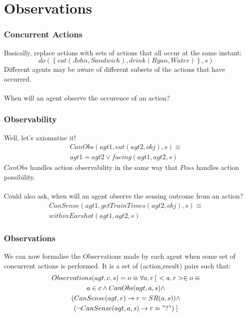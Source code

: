 \documentclass{beamer}
\begin{document}
\section{Observations}

\begin{frame}
\frametitle{Concurrent Actions}
Basically, replace actions with sets of actions that all occur at the same
instant:
\begin{equation*}
  do(\left\{eat(John,Sandwich),drink(Ryan,Water)\right\},s)
\end{equation*}
Different agents may be aware of different subsets of the actions that
have occurred.
\ \\
\ \\
\pause
When will an agent observe the occurence of an action?
\end{frame}

\begin{frame}
\frametitle{Observability}
Well, let's axiomatise it!
\begin{multline*}
  CanObs(agt1,eat(agt2,obj),s) \equiv \\
     agt1=agt2 \vee facing(agt1,agt2,s)
\end{multline*}
$CanObs$ handles action observability in the same way that $Poss$ handles
action possibility.
\ \\
\ \\
\pause
Could also ask, when will an agent observe the sensing outcome from an
action?
\begin{multline*}
  CanSense(agt1,getTrainTimes(agt2,obj),s) \equiv \\ withinEarshot(agt1,agt2,s)
\end{multline*}
\end{frame}

\begin{frame}
\frametitle{Observations}
We can now formalise the Observations made by each agent when some set of
concurrent actions is performed.  It is a set of (action,result) pairs such
that:
\begin{multline*}
Observations(agt,c,s) = o \equiv \forall a,r \left[\right. <a,r> \in o \equiv \\
  a \in c \wedge CanObs(agt,a,s) \wedge \\
  (CanSense(agt,r) \rightarrow r = SR(a,s)) \wedge \\
  (\neg CanSense(agt,a,s) \rightarrow r = "?") \left.\right]
\end{multline*}

\end{frame}
\end{document}
